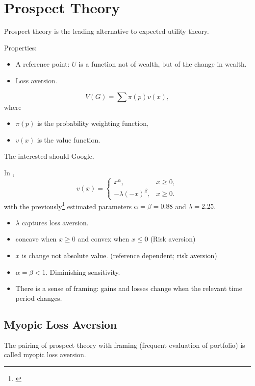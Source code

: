 \documentclass[oneside,reqno,letterpaper]{amsart}
\begin{document}
\section{Prospect Theory}
Prospect theory is the leading alternative to expected utility theory.

Properties:
\begin{itemize}
  \item A reference point: \(U\) is a function not of wealth, but of the change in wealth.
  \item Loss aversion. 
\end{itemize}
\[
  V(G) = \sum \pi(p) v(x),
\] 
where
\begin{itemize}
  \item \(\pi(p)\) is the probability weighting function,
  \item \(v(x)\) is the value function.
\end{itemize}
The interested should Google.

In \textcite{Benartzi1995Myopic}, 
\[
  v(x) = \begin{cases}
    x^{\alpha}, & x \geq 0, \\ 
    -\lambda (-x)^{\beta}, & x \geq 0. 
  \end{cases}
\] 
with the previously\footnote{\textcite{Tversky1992Advances}} estimated parameters \(\alpha = \beta = 0.88\) and \(\lambda = 2.25\). 


\begin{itemize}
  \item \(\lambda\) captures loss aversion.
  \item concave when \(x \geq 0\) and convex when \(x \leq 0\) (Risk aversion)
  \item \(x\) is change not absolute value. (reference dependent; risk aversion)
  \item \(\alpha = \beta < 1\). Diminishing sensitivity. 
  \item There is a sense of framing: gains and losses change when the relevant time period changes.
\end{itemize}



\subsection{Myopic Loss Aversion}
The pairing of prospect theory with framing (frequent evaluation of portfolio) is called myopic loss aversion. 
\end{document}
